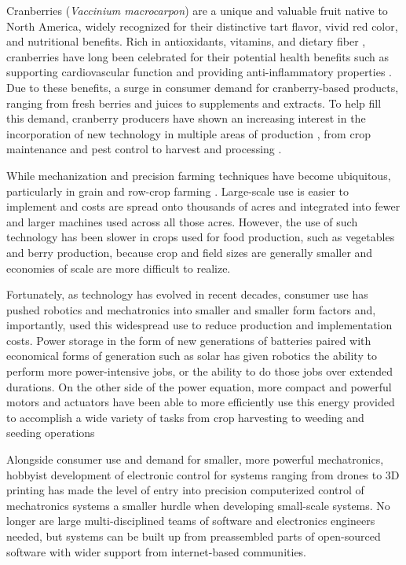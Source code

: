 Cranberries (\textit{Vaccinium macrocarpon}) are a unique and valuable fruit native to North America, widely recognized for their distinctive tart flavor, vivid red color, and nutritional benefits. Rich in antioxidants, vitamins, and dietary fiber \cite{blumberg_impact_2016}, cranberries have long been celebrated for their potential health benefits such as supporting cardiovascular function and providing anti-inflammatory properties \cite {leahy_cranberry-promising_2001}. Due to these benefits, a surge in consumer demand for cranberry-based products, ranging from fresh berries and juices to supplements and extracts. To help fill this demand, cranberry producers have shown an increasing interest in the incorporation of new technology in multiple areas of production \cite{jackson_case_2021}, from crop maintenance and pest control to harvest and processing \cite{johnson_ml_cranberry_2008}. 

While mechanization and precision farming techniques have become ubiquitous, particularly in grain and row-crop farming \cite{hameed_technology_2025}. Large-scale use is easier to implement and costs are spread onto thousands of acres and integrated into fewer and larger machines used across all those acres. However, the use of such technology has been slower in crops used for food production, such as vegetables and berry production, because crop and field sizes are generally smaller and economies of scale are more difficult to realize.

Fortunately, as technology has evolved in recent decades, consumer use has pushed robotics and mechatronics into smaller and smaller form factors and, importantly, used this widespread use to reduce production and implementation costs. Power storage in the form of new generations of batteries paired with economical forms of generation such as solar has given robotics the ability to perform more power-intensive jobs, or the ability to do those jobs over extended durations.  On the other side of the power equation, more compact and powerful motors and actuators have been able to more efficiently use this energy provided to accomplish a wide variety of tasks from crop harvesting \cite{das_designing_2024} to weeding and seeding operations \cite{vahdanjoo_operational_2023}

Alongside consumer use and demand for smaller, more powerful mechatronics, hobbyist development of electronic control for systems ranging from drones to 3D printing has made the level of entry into precision computerized control of mechatronics systems a smaller hurdle when developing small-scale systems. No longer are large multi-disciplined teams of software and electronics engineers needed, but systems can be built up from preassembled parts of open-sourced software with wider support from internet-based communities.


